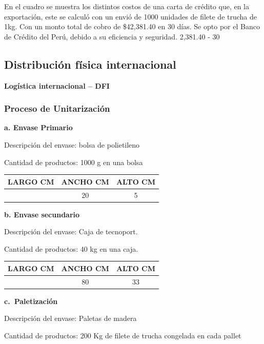 \documentclass[
  stu,
  floatsintext,
  longtable,
  a4paper,
  nolmodern,
  notxfonts,
  notimes,
  12pt,
  colorlinks=true,linkcolor=blue,citecolor=blue,urlcolor=blue]{apa7}
\newcounter{none} %
\begin{document}
En el cuadro se muestra los distintos costos de una carta de crédito
que, en la exportación, este se calculó con un envió de 1000 unidades de
filete de trucha de 1kg. Con un monto total de cobro de \$42,381.40 en
30 días. Se opto por el Banco de Crédito del Perú, debido a su
eficiencia y seguridad. 2,381.40 - 30

\subsection{Distribución física
internacional}\label{distribuciuxf3n-fuxedsica-internacional}

\textbf{Logística internacional -- DFI}

\subsubsection{Proceso de
Unitarización}\label{proceso-de-unitarizaciuxf3n}

\textbf{a. Envase Primario}

Descripción del envase: bolsa de polietileno

Cantidad de productos: 1000 g en una bolsa

{\def\LTcaptype{none} %
\begin{longtable}[]{@{}ccc@{}}
\toprule\noalign{}
LARGO CM & ANCHO CM & ALTO CM \\
\midrule\noalign{}
\endhead
\bottomrule\noalign{}
\endlastfoot
30 & 20 & 5 \\
\end{longtable}
}

\textbf{b. Envase secundario}

Descripción del envase: Caja de tecnoport.

Cantidad de productos: 40 kg en una caja.

{\def\LTcaptype{none} %
\begin{longtable}[]{@{}ccc@{}}
\toprule\noalign{}
LARGO CM & ANCHO CM & ALTO CM \\
\midrule\noalign{}
\endhead
\bottomrule\noalign{}
\endlastfoot
60 & 80 & 33 \\
\end{longtable}
}

\textbf{c.~Paletización}

Descripción del envase: Paletas de madera

Cantidad de productos: 200 Kg de filete de trucha congelada en cada
pallet
\end{document}
